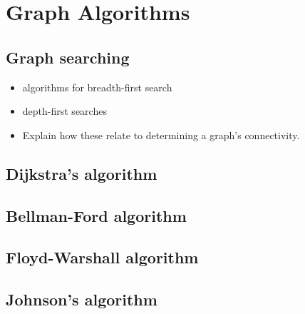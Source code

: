 
\chapter{Graph Algorithms}
\label{chap:graph_algorithms}



\section{Graph searching}

\begin{itemize}
\item algorithms for breadth-first search

\item depth-first searches

\item Explain how these relate to determining a graph's connectivity.
\end{itemize}



\section{Dijkstra's algorithm}



\section{Bellman-Ford algorithm}



\section{Floyd-Warshall algorithm}



\section{Johnson's algorithm}
